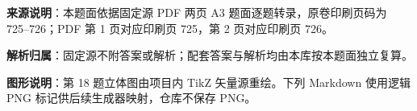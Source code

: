 


\begin{gknotice}
\textbf{来源说明}：本题面依据固定源 PDF 两页 A3 题面逐题转录，原卷印刷页码为 725–726；PDF 第 1 页对应印刷页 725，第 2 页对应印刷页 726。

\textbf{解析归属}：固定源不附答案或解析；配套答案与解析均由本库按本题面独立复算。

\textbf{图形说明}：第 18 题立体图由项目内 TikZ 矢量源重绘。下列 Markdown 使用逻辑 PNG 标记供后续生成器映射，仓库不保存 PNG。
\end{gknotice}


